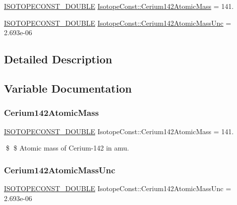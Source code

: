 \begin{DoxyCompactItemize}
\item 
\mbox{\hyperlink{group___isotope_const-_macros_ga8f45a7272ce02c0b4c65c44636ed719a}{I\+S\+O\+T\+O\+P\+E\+C\+O\+N\+S\+T\+\_\+\+D\+O\+U\+B\+LE}} \mbox{\hyperlink{group___isotope_const-_cerium-_ce142_ga5a7e9c27f6547455839e6fdb93e0353d}{Isotope\+Const\+::\+Cerium142\+Atomic\+Mass}} = 141.
\item 
\mbox{\hyperlink{group___isotope_const-_macros_ga8f45a7272ce02c0b4c65c44636ed719a}{I\+S\+O\+T\+O\+P\+E\+C\+O\+N\+S\+T\+\_\+\+D\+O\+U\+B\+LE}} \mbox{\hyperlink{group___isotope_const-_cerium-_ce142_ga23d106dfe826903eb4d1b9c9f0ffebc0}{Isotope\+Const\+::\+Cerium142\+Atomic\+Mass\+Unc}} = 2.\+693e-\/06
\end{DoxyCompactItemize}


\subsection{Detailed Description}


\subsection{Variable Documentation}
\mbox{\label{group___isotope_const-_cerium-_ce142_ga5a7e9c27f6547455839e6fdb93e0353d}} 
\subsubsection{\texorpdfstring{Cerium142\+Atomic\+Mass}{Cerium142AtomicMass}}
{\footnotesize\ttfamily \mbox{\hyperlink{group___isotope_const-_macros_ga8f45a7272ce02c0b4c65c44636ed719a}{I\+S\+O\+T\+O\+P\+E\+C\+O\+N\+S\+T\+\_\+\+D\+O\+U\+B\+LE}} Isotope\+Const\+::\+Cerium142\+Atomic\+Mass = 141.}

\$ \$ Atomic mass of Cerium-\/142 in amu. \mbox{\label{group___isotope_const-_cerium-_ce142_ga23d106dfe826903eb4d1b9c9f0ffebc0}} 
\subsubsection{\texorpdfstring{Cerium142\+Atomic\+Mass\+Unc}{Cerium142AtomicMassUnc}}
{\footnotesize\ttfamily \mbox{\hyperlink{group___isotope_const-_macros_ga8f45a7272ce02c0b4c65c44636ed719a}{I\+S\+O\+T\+O\+P\+E\+C\+O\+N\+S\+T\+\_\+\+D\+O\+U\+B\+LE}} Isotope\+Const\+::\+Cerium142\+Atomic\+Mass\+Unc = 2.\+693e-\/06}

